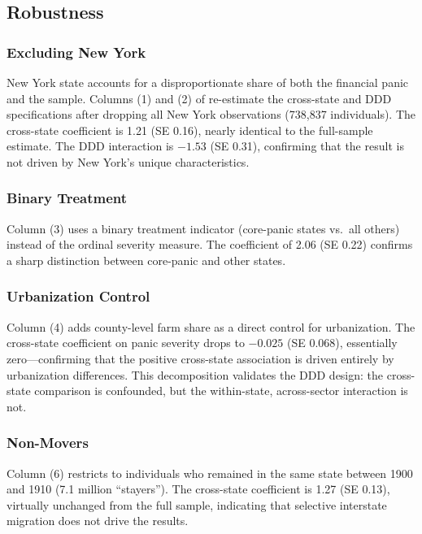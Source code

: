 \documentclass[12pt]{article}
\begin{document}
\subsection{Robustness}



\subsubsection*{Excluding New York} New York state accounts for a disproportionate share of both the financial panic and the sample. Columns (1) and (2) of  re-estimate the cross-state and DDD specifications after dropping all New York observations (738,837 individuals). The cross-state coefficient is 1.21 (SE 0.16), nearly identical to the full-sample estimate. The DDD interaction is $-1.53$ (SE 0.31), confirming that the result is not driven by New York's unique characteristics.

\subsubsection*{Binary Treatment} Column (3) uses a binary treatment indicator (core-panic states vs.\ all others) instead of the ordinal severity measure. The coefficient of 2.06 (SE 0.22) confirms a sharp distinction between core-panic and other states.

\subsubsection*{Urbanization Control} Column (4) adds county-level farm share as a direct control for urbanization. The cross-state coefficient on panic severity drops to $-0.025$ (SE 0.068), essentially zero---confirming that the positive cross-state association is driven entirely by urbanization differences. This decomposition validates the DDD design: the cross-state comparison is confounded, but the within-state, across-sector interaction is not.

\subsubsection*{Non-Movers} Column (6) restricts to individuals who remained in the same state between 1900 and 1910 (7.1 million ``stayers''). The cross-state coefficient is 1.27 (SE 0.13), virtually unchanged from the full sample, indicating that selective interstate migration does not drive the results.
\end{document}
